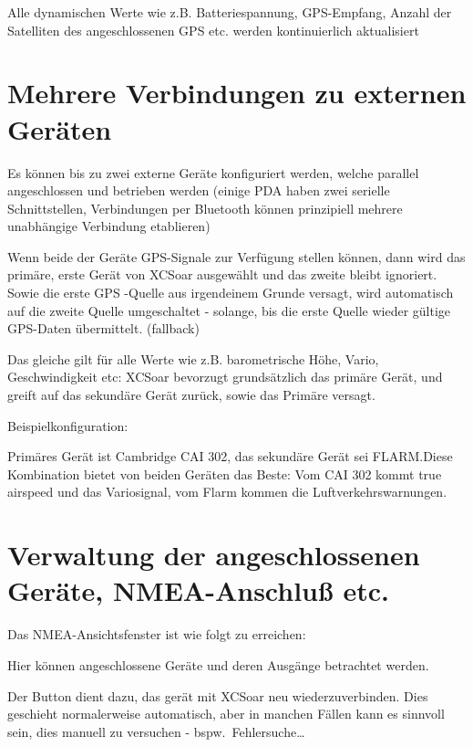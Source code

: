 Alle dynamischen Werte wie z.B. Batteriespannung, GPS-Empfang, Anzahl der Satelliten des angeschlossenen GPS etc. werden kontinuierlich aktualisiert


\section{Mehrere Verbindungen zu externen Geräten}

Es können bis zu zwei externe Geräte konfiguriert werden, welche parallel angeschlossen und betrieben werden (einige \textsf{PDA} haben zwei serielle Schnittstellen, Verbindungen per Bluetooth können prinzipiell mehrere unabhängige Verbindung etablieren)

Wenn  beide der Geräte GPS-Signale zur Verfügung stellen können, dann wird das primäre, erste Gerät von \textsf{XCSoar} ausgewählt und das zweite bleibt ignoriert. Sowie die erste GPS -Quelle aus irgendeinem Grunde versagt, wird automatisch auf die zweite Quelle umgeschaltet - solange, bis die erste Quelle wieder gültige GPS-Daten übermittelt. (fallback)

Das gleiche gilt für alle Werte wie z.B. barometrische Höhe, Vario, Geschwindigkeit etc:
\textsf{XCSoar} bevorzugt grundsätzlich das primäre Gerät, und greift auf das sekundäre Gerät zurück, sowie das Primäre versagt.

Beispielkonfiguration:

Primäres Gerät ist Cambridge CAI 302, das sekundäre Gerät sei  FLARM.Diese Kombination bietet von beiden Geräten das Beste:
\halt
Vom CAI 302 kommt true airspeed und das Variosignal, vom Flarm kommen die  Luftverkehrswarnungen.


\section{Verwaltung der angeschlossenen Geräte, NMEA-Anschluß etc.\ }

Das NMEA-Ansichtsfenster ist wie folgt zu erreichen:
\begin{quote}
\blink{}\blink{}\blink{}\blink
\end{quote}

Hier können angeschlossene Geräte und  deren Ausgänge  betrachtet werden.

Der Button  dient dazu, das gerät mit \textsf{XCSoar} neu wiederzuverbinden. Dies geschieht normalerweise automatisch, aber in manchen Fällen kann es sinnvoll sein, dies manuell zu versuchen - bspw.\ Fehlersuche\dots

